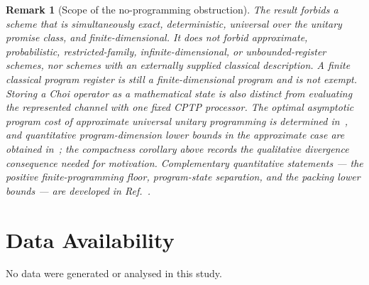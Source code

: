 \documentclass[11pt,a4paper]{article}
\newtheorem{remark}[theorem]{Remark}
\begin{document}
\begin{remark}[Scope of the no-programming obstruction]
\label{rem:scope}
The result forbids a scheme that is simultaneously exact, deterministic, universal over the unitary promise class, and finite-dimensional. It does not forbid approximate, probabilistic, restricted-family, infinite-dimensional, or unbounded-register schemes, nor schemes with an externally supplied classical description. A finite classical program register is still a finite-dimensional program and is not exempt. Storing a Choi operator as a mathematical state is also distinct from evaluating the represented channel with one fixed CPTP processor. The optimal asymptotic program cost of approximate universal unitary programming is determined in~\cite{YangRennerChiribella2020}, and quantitative program-dimension lower bounds in the approximate case are obtained in~\cite{KubickiPalazuelosPerezGarcia2019}; the compactness corollary above records the qualitative divergence consequence needed for motivation. Complementary quantitative statements --- the positive finite-programming floor, program-state separation, and the packing lower bounds --- are developed in Ref.~\cite{CompanionChannels}.
\end{remark}

\section*{Data Availability}
No data were generated or analysed in this study.
\end{document}
